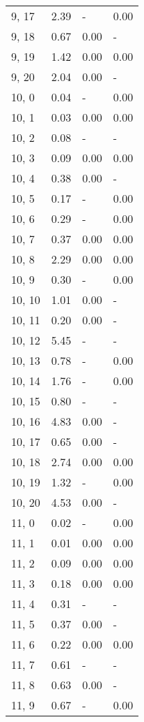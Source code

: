 \begin{table}
\begin{tabular}{llll}
9, 17  &    2.39 &     - &  0.00 \\
9, 18  &    0.67 &  0.00 &     - \\
9, 19  &    1.42 &  0.00 &  0.00 \\
9, 20  &    2.04 &  0.00 &     - \\
10, 0  &    0.04 &     - &  0.00 \\
10, 1  &    0.03 &  0.00 &  0.00 \\
10, 2  &    0.08 &     - &     - \\
10, 3  &    0.09 &  0.00 &  0.00 \\
10, 4  &    0.38 &  0.00 &     - \\
10, 5  &    0.17 &     - &  0.00 \\
10, 6  &    0.29 &     - &  0.00 \\
10, 7  &    0.37 &  0.00 &  0.00 \\
10, 8  &    2.29 &  0.00 &  0.00 \\
10, 9  &    0.30 &     - &  0.00 \\
10, 10 &    1.01 &  0.00 &     - \\
10, 11 &    0.20 &  0.00 &     - \\
10, 12 &    5.45 &     - &     - \\
10, 13 &    0.78 &     - &  0.00 \\
10, 14 &    1.76 &     - &  0.00 \\
10, 15 &    0.80 &     - &     - \\
10, 16 &    4.83 &  0.00 &     - \\
10, 17 &    0.65 &  0.00 &     - \\
10, 18 &    2.74 &  0.00 &  0.00 \\
10, 19 &    1.32 &     - &  0.00 \\
10, 20 &    4.53 &  0.00 &     - \\
11, 0  &    0.02 &     - &  0.00 \\
11, 1  &    0.01 &  0.00 &  0.00 \\
11, 2  &    0.09 &  0.00 &  0.00 \\
11, 3  &    0.18 &  0.00 &  0.00 \\
11, 4  &    0.31 &     - &     - \\
11, 5  &    0.37 &  0.00 &     - \\
11, 6  &    0.22 &  0.00 &  0.00 \\
11, 7  &    0.61 &     - &     - \\
11, 8  &    0.63 &  0.00 &     - \\
11, 9  &    0.67 &     - &  0.00 \\

\end{tabular}
\end{table}
